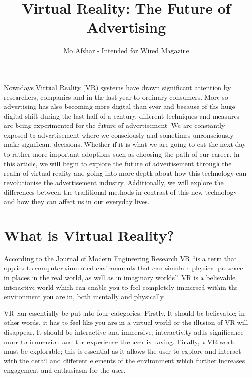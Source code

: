 \documentclass[11pt]{article} %
\title{Virtual Reality: The Future of Advertising}
\author{Mo Afshar - Intended for Wired Magazine}
\begin{document}
\maketitle
Nowadays Virtual Reality (VR) systems have drawn significant attention by researchers, companies and in the last year to ordinary consumers. More so advertising has also becoming more digital than ever and because of the huge digital shift during the last half of a century, different techniques and measures are being experimented for the future of advertisement. We are constantly exposed to advertisement where we consciously and sometimes unconsciously make significant decisions. Whether if it is what we are going to eat the next day to rather more important adoptions such as choosing the path of our career. In this article, we will begin to explore the future of advertisement through the realm of virtual reality and going into more depth about how this technology can revolutionise the advertisement industry. Additionally, we will explore the differences between the traditional methods in contrast of this new technology and how they can affect us in our everyday lives.  
\par

\section{What is Virtual Reality?}
According to the Journal of Modern Engineering Research VR “is a term that applies to computer-simulated environments that can simulate physical presence in places in the real world, as well as in imaginary worlds”. VR is a believable, interactive world which can enable you to feel completely immersed within the environment you are in, both mentally and physically. 
\par

VR can essentially be put into four categories. Firstly, It should be believable; in other words, it has to feel like you are in a virtual world or the illusion of VR will disappear. It should be interactive and immersive; interactivity adds significance more to immersion and the experience the user is having. Finally, a VR world must be explorable; this is essential as it allows the user to explore and interact with the detail and different elements of the environment which further increases engagement and enthusiasm for the user.  
\par
\end{document}
